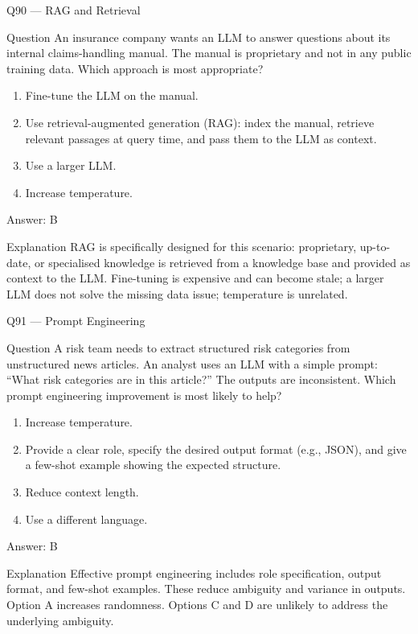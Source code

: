 \documentclass[aspectratio=169,8pt]{beamer}
\begin{document}
\begin{frame}{Q90 --- RAG and Retrieval}
\begin{block}{Question}
An insurance company wants an LLM to answer questions about its internal claims-handling manual. The manual is proprietary and not in any public training data. Which approach is most appropriate?
\end{block}
\begin{enumerate}
\item Fine-tune the LLM on the manual.
\item Use retrieval-augmented generation (RAG): index the manual, retrieve relevant passages at query time, and pass them to the LLM as context.
\item Use a larger LLM.
\item Increase temperature.
\end{enumerate}
\begin{exampleblock}{Answer: B}\end{exampleblock}
\begin{block}{Explanation}
RAG is specifically designed for this scenario: proprietary, up-to-date, or specialised knowledge is retrieved from a knowledge base and provided as context to the LLM. Fine-tuning is expensive and can become stale; a larger LLM does not solve the missing data issue; temperature is unrelated.
\end{block}
\end{frame}

\begin{frame}{Q91 --- Prompt Engineering}
\begin{block}{Question}
A risk team needs to extract structured risk categories from unstructured news articles. An analyst uses an LLM with a simple prompt: ``What risk categories are in this article?'' The outputs are inconsistent. Which prompt engineering improvement is most likely to help?
\end{block}
\begin{enumerate}
\item Increase temperature.
\item Provide a clear role, specify the desired output format (e.g., JSON), and give a few-shot example showing the expected structure.
\item Reduce context length.
\item Use a different language.
\end{enumerate}
\begin{exampleblock}{Answer: B}\end{exampleblock}
\begin{block}{Explanation}
Effective prompt engineering includes role specification, output format, and few-shot examples. These reduce ambiguity and variance in outputs. Option A increases randomness. Options C and D are unlikely to address the underlying ambiguity.
\end{block}
\end{frame}
\end{document}
